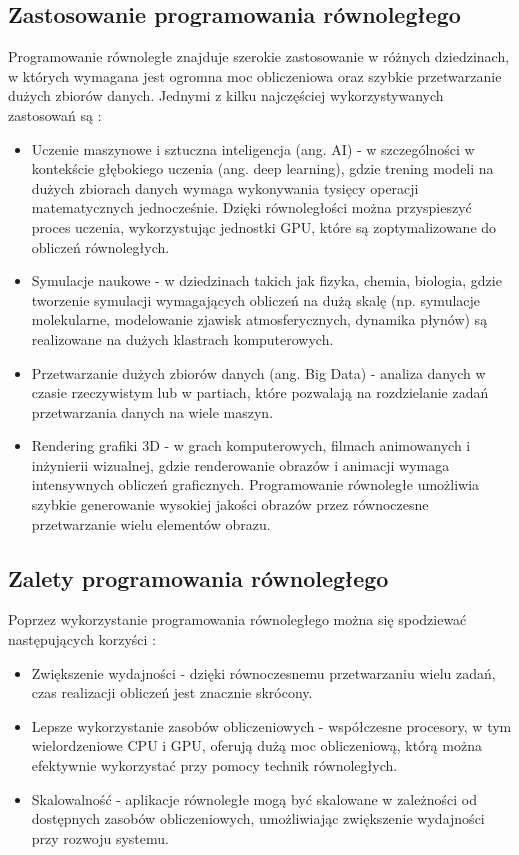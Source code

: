 \subsection{Zastosowanie programowania równoległego}
Programowanie równoległe znajduje szerokie zastosowanie w różnych dziedzinach, w których wymagana jest ogromna moc obliczeniowa oraz szybkie przetwarzanie dużych zbiorów danych. Jednymi z kilku najczęściej wykorzystywanych zastosowań są \cite{ParallelProgramming}:
\begin{itemize}
    \item Uczenie maszynowe i sztuczna inteligencja (ang. AI) - w szczególności w kontekście głębokiego uczenia (ang. deep learning), gdzie trening modeli na dużych zbiorach danych wymaga wykonywania tysięcy operacji matematycznych jednocześnie. Dzięki równoległości można przyspieszyć proces uczenia, wykorzystując jednostki GPU, które są zoptymalizowane do obliczeń równoległych.
    \item Symulacje naukowe - w dziedzinach takich jak fizyka, chemia, biologia, gdzie tworzenie symulacji wymagających obliczeń na dużą skalę (np. symulacje molekularne, modelowanie zjawisk atmosferycznych, dynamika płynów) są realizowane na dużych klastrach komputerowych.
    \item Przetwarzanie dużych zbiorów danych (ang. Big Data) - analiza danych w czasie rzeczywistym lub w partiach, które pozwalają na rozdzielanie zadań przetwarzania danych na wiele maszyn.
    \item Rendering grafiki 3D - w grach komputerowych, filmach animowanych i inżynierii wizualnej, gdzie renderowanie obrazów i animacji wymaga intensywnych obliczeń graficznych. Programowanie równoległe umożliwia szybkie generowanie wysokiej jakości obrazów przez równoczesne przetwarzanie wielu elementów obrazu.
\end{itemize}

\subsection{Zalety programowania równoległego}
Poprzez wykorzystanie programowania równoległego można się spodziewać następujących korzyści \cite{ParallelProgramming}:
\begin{itemize}
    \item Zwiększenie wydajności - dzięki równoczesnemu przetwarzaniu wielu zadań, czas realizacji obliczeń jest znacznie skrócony.
    \item Lepsze wykorzystanie zasobów obliczeniowych - współczesne procesory, w tym wielordzeniowe CPU i GPU, oferują dużą moc obliczeniową, którą można efektywnie wykorzystać przy pomocy technik równoległych.
    \item Skalowalność - aplikacje równoległe mogą być skalowane w zależności od dostępnych zasobów obliczeniowych, umożliwiając zwiększenie wydajności przy rozwoju systemu.
\end{itemize}

